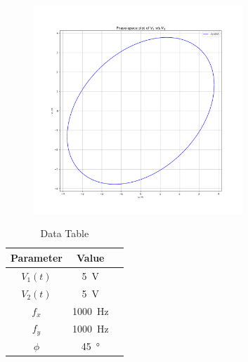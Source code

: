 \documentclass[a4paper,12pt]{article}
\begin{document}
\begin{figure}[htbp]
\begin{center}
    \includegraphics[width=0.7\textwidth]{figs/3/pplot.png}
\end{center}
\end{figure}

\begin{table}[htbp]
    \centering
    \begin{tabular}{|c|c|c|}
        \hline
        \textbf{Parameter} & \textbf{Value} \\
        \hline
        $V_1(t)$ & \SI{5}{\volt} \\
        $V_2(t)$ & \SI{5}{\volt} \\
        $f_x$ & \SI{1000}{\hertz} \\
        $f_y$ & \SI{1000}{\hertz} \\
        $\phi$ & \SI{45}{\degree} \\
        \hline
    \end{tabular}
    \caption{Data Table}
    \label{tab:sample}
\end{table}
\end{document}
